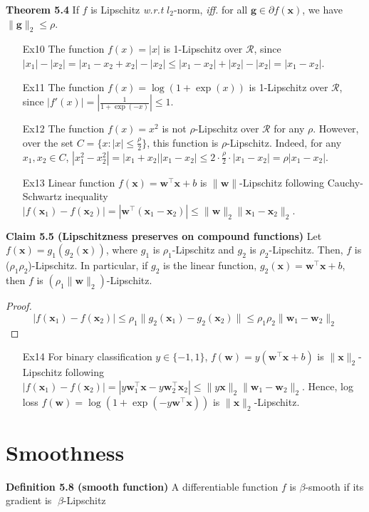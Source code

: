 \documentclass{article}
\newtheorem*{proof}{Proof}
\begin{document}
	\textbf{Theorem 5.4} If $f$ is Lipschitz \textit{w.r.t} $l_2$-norm, \textit{iff.} for all $\mathbf{g}\in\partial f(\mathbf{x})$, we have $\|\mathbf{g}\|_2\leq \rho$.
	\begin{itemize}
	\item[Ex10] The function $f(x) = |x|$ is 1-Lipschitz over $\mathcal{R}$, since $|x_1|-|x_2|=|x_1-x_2+x_2|-|x_2|\leq |x_1-x_2|+|x_2|-|x_2|=|x_1-x_2|$.
	\item[Ex11] The function $f(x)=\log(1+\exp(x))$ is 1-Lipschitz over $\mathcal{R}$, since $|f'(x)|=|\frac{1}{1+\exp(-x)}|\leq 1$.
	\item[Ex12] The function $f(x)=x^2$ is not $\rho$-Lipschitz over $\mathcal{R}$ for any $\rho$. However, over the set $C=\{x:|x|\leq \frac{\rho}{2}\}$, this function is $\rho$-Lipschitz. Indeed, for any $x_1, x_2\in C$, $|x_1^2-x_2^2|=|x_1+x_2||x_1-x_2|\leq 2\cdot\frac{\rho}{2}\cdot|x_1-x_2|=\rho|x_1-x_2|$.
	\item[Ex13] Linear function $f(\mathbf{x})=\mathbf{w}^\top \mathbf{x}+b$ is $\|\mathbf{w}\|$-Lipschitz following Cauchy-Schwartz inequality $|f(\mathbf{x}_1)-f(\mathbf{x}_2)|=|\mathbf{w}^\top (\mathbf{x}_1 - \mathbf{x}_2)| \leq \|\mathbf{w}\|_2\|\mathbf{x}_1 - \mathbf{x}_2\|_2$.
	\end{itemize}
	\textbf{Claim 5.5 (Lipschitzness preserves on compound functions)} Let $f( \mathbf{x}) = g_1(g_2(\mathbf{x}))$, where $g_1$ is $\rho_1$-Lipschitz and $g_2$ is $\rho_2$-Lipschitz. Then, $f$ is ($\rho_1 \rho_2$)-Lipschitz. In particular, if $g_2$ is the linear function, $g_2( \mathbf{x}) =  \mathbf{w}^\top  \mathbf{x} + b$, then $f$ is $(\rho_1 \| \mathbf{w}\|_2)$-Lipschitz.
\begin{proof}
$$|f(\mathbf{x}_1)-f(\mathbf{x}_2)|\leq \rho_1 \|g_2(\mathbf{x}_1)-g_2(\mathbf{x}_2)\|\leq \rho_1\rho_2 \|\mathbf{w}_1-\mathbf{w}_2\|_2$$
\end{proof}

	\begin{itemize}
	\item[Ex14]  For binary classification $y\in\{-1, 1\}$, $f(\mathbf{w})=y(\mathbf{w}^\top \mathbf{x}+b)$ is $\|\mathbf{x}\|_2$-Lipschitz following $|f(\mathbf{x}_1)-f(\mathbf{x}_2)|=|y\mathbf{w}_1^\top \mathbf{x} -y \mathbf{w}_2^\top\mathbf{x}_2| \leq \|y\mathbf{x}\|_2\|\mathbf{w}_1 - \mathbf{w}_2\|_2$. Hence, log loss $f(\mathbf{w})=\log(1+\exp(-y\mathbf{w}^\top \mathbf{x}))$ is  $\|\mathbf{x}\|_2$-Lipschitz.
	\end{itemize}
	
\section{Smoothness}
	\noindent\textbf{Definition 5.8 (smooth function)} A differentiable function $f$ is $\beta$-smooth if its gradient is $\beta$-Lipschitz
\end{document}
